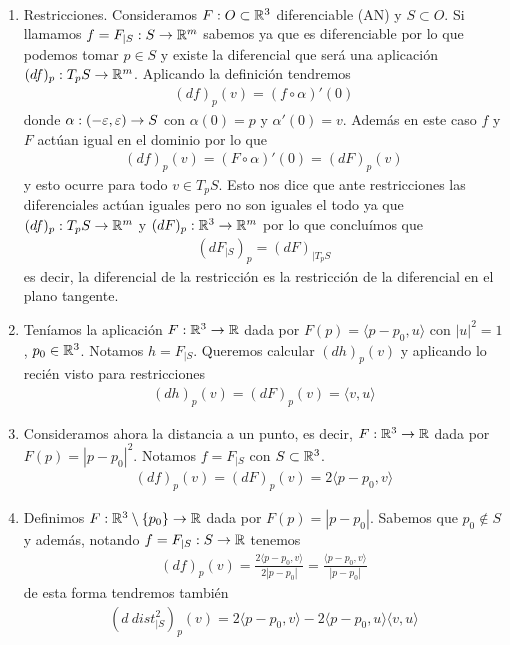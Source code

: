 \begin{ejemplo}\
    \begin{enumerate}
        \item Restricciones. Consideramos $F:O\subset \mathbb{R}^3$ diferenciable (AN) y $S\subset O$. Si llamamos $f=F_{|S}:S\to \mathbb{R}^m$ sabemos ya que es diferenciable por lo que podemos tomar $p\in S$ y existe la diferencial que será una aplicación $(df)_p: T_pS\to \mathbb{R}^m$. Aplicando la definición tendremos
        \begin{gather*}
            (df)_p(v)=(f \circ \alpha)'(0)
        \end{gather*}
        donde $\alpha:(-\varepsilon, \varepsilon) \to S$ con $\alpha(0)=p$ y $\alpha'(0)=v$. Además en este caso $f$ y $F$ actúan igual en el dominio por lo que 
        \begin{gather*}
            (df)_p(v)=(F \circ \alpha)'(0) = (dF)_p(v)
        \end{gather*}
        y esto ocurre para todo $v\in T_pS$. Esto nos dice que ante restricciones las diferenciales actúan iguales pero no son iguales el todo ya que $(df)_p : T_pS \to \mathbb{R}^m$ y $(dF)_p : \mathbb{R}^3 \to \mathbb{R}^m$ por lo que concluímos que 
        \begin{gather*}
            (dF_{|S})_p = (dF)_{|T_pS}
        \end{gather*}
        es decir, la diferencial de la restricción es la restricción de la diferencial en el plano tangente.
        
        \item Teníamos la aplicación $F:\mathbb{R}^3\to \mathbb{R}$ dada por $F(p)=\langle p -p_0, u\rangle$ con $|u|^2=1$, $p_0\in \mathbb{R}^3$. Notamos $h=F_{|S}$. Queremos calcular $(dh)_p(v)$ y aplicando lo recién visto para restricciones
        \begin{gather*}
            (dh)_p(v) = (dF)_p(v) = \langle v,u \rangle
        \end{gather*}

        \item Consideramos ahora la distancia a un punto, es decir, $F:\mathbb{R}^3\to \mathbb{R}$ dada por $F(p)=|p-p_0|^2$. Notamos $f=F_{|S}$ con $S\subset \mathbb{R}^3$.
        \begin{gather*}
            (df)_p(v) = (dF)_p(v) = 2\langle p-p_0, v \rangle
        \end{gather*}

        \item Definimos $F:\mathbb{R}^3 \setminus \{p_0\} \to \mathbb{R}$ dada por $F(p)=|p-p_0|$. Sabemos que $p_0\notin S$ y además, notando $f= F_{|S}:S\to \mathbb{R}$ tenemos 
        \begin{gather*}
            (df)_p(v)=\frac{2\langle p-p_0,v\rangle}{2|p-p_0|} = \frac{\langle p-p_0,v\rangle}{|p-p_0|}
        \end{gather*}
        de esta forma tendremos también
        \begin{gather*}
            (d\ dist^2_{|S})_p(v) = 2\langle p-p_0,v\rangle - 2 \langle p-p_0, u\rangle \langle v,u\rangle
        \end{gather*}


\end{enumerate}
\end{ejemplo}
